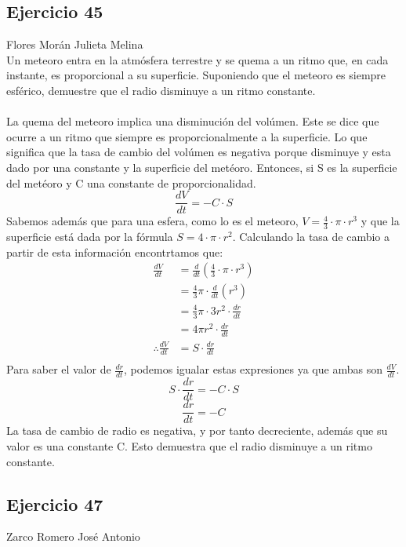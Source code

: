 \documentclass[12pt]{article}
\begin{document}
\subsection{Ejercicio 45} Flores Morán Julieta Melina \\

Un meteoro entra en la atmósfera terrestre y se quema a un ritmo que, en cada instante, es proporcional a su superficie. Suponiendo que el meteoro es siempre esférico, demuestre que el radio disminuye a un ritmo constante.\\ \\
La quema del meteoro implica una disminución del volúmen. Este se dice que ocurre a un ritmo que siempre es proporcionalmente a la superficie. Lo que significa que la tasa de cambio del volúmen es negativa porque disminuye y esta dado por una constante y la superficie del metéoro. Entonces, si S es la superficie del metéoro y C una constante de proporcionalidad.
\[
\frac{dV}{dt} = -C \cdot S
\]
Sabemos además que para una esfera, como lo es el meteoro, $V= \frac{4}{3}\cdot \pi \cdot r^{3}$ y que la superficie está dada por la fórmula $S=4 \cdot \pi \cdot r^{2}$.
Calculando la tasa de cambio a partir de esta información encontrtamos que:
\begin{equation*}
  \begin{split}
  \frac{dV}{dt} 
  &= \frac{d}{dt} (\frac{4}{3}\cdot \pi \cdot r^{3})\\
  &= \frac{4}{3} \pi \cdot  \frac{d}{dt} (r^{3})\\
  &= \frac{4}{3} \pi \cdot  3r^{2} \cdot \frac{dr}{dt}\\
  &= 4  \pi r^{2} \cdot \frac{dr}{dt}\\
  \therefore
   \frac{dV}{dt}
     &= S  \cdot \frac{dr}{dt} \\
  \end{split}
\end{equation*}
Para saber el valor de $\frac{dr}{dt}$, podemos igualar estas expresiones ya que ambas son $  \frac{dV}{dt}$.
\[
 S  \cdot \frac{dr}{dt} =  -C \cdot S  
 \]
 \[
  \frac{dr}{dt} =  -C  
  \]
La tasa de cambio de radio es negativa, y por tanto decreciente, además que su valor es una constante C. Esto demuestra que el radio disminuye a un ritmo constante. 

\subsection{Ejercicio 47} Zarco Romero José Antonio \\
\end{document}
